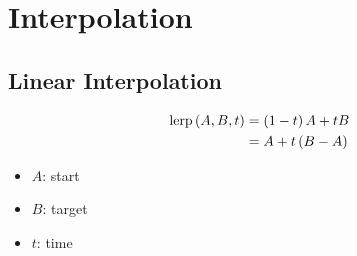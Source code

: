 \chapter{Interpolation}

\section{Linear Interpolation}

  \begin{align}
    \operatorname{lerp}\left( A, B, t \right)
    &= \left( 1 - t \right) A + tB \\
    &= A + t\left( B - A \right)
  \end{align}

  \begin{itemize}
    \item $ A $: start
    \item $ B $: target
    \item $ t $: time
  \end{itemize}

